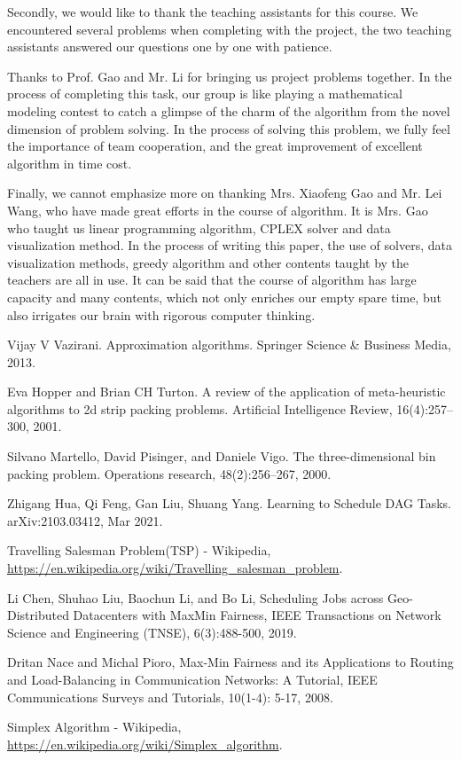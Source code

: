 \documentclass{llncs}
\begin{document}
Secondly, we would like to thank the teaching assistants for this course. We encountered several problems when completing with the project, the two teaching assistants answered our questions one by one with patience.

Thanks to Prof. Gao and Mr. Li for bringing us project problems together. In the process of completing this task, our group is like playing a mathematical modeling contest to catch a glimpse of the charm of the algorithm from the novel dimension of problem solving. In the process of solving this problem, we fully feel the importance of team cooperation, and the great improvement of excellent algorithm in time cost.

Finally, we cannot emphasize more on thanking Mrs. Xiaofeng Gao and Mr. Lei Wang, who have made great efforts in the course of algorithm. It is Mrs. Gao who taught us linear programming algorithm, CPLEX solver and data visualization method. In the process of writing this paper, the use of solvers, data visualization methods, greedy algorithm and other contents taught by the teachers are all in use. It can be said that the course of algorithm has large capacity and many contents, which not only enriches our empty spare time, but also irrigates our brain with rigorous computer thinking.  

%
%
%
% 
% 
%
\begin{thebibliography}{8}

Vijay V Vazirani. Approximation algorithms. Springer Science \& Business Media, 2013.

Eva Hopper and Brian CH Turton. A review of the application of meta-heuristic algorithms to 2d strip packing problems. Artificial Intelligence Review, 16(4):257–300, 2001.

Silvano Martello, David Pisinger, and Daniele Vigo. The three-dimensional bin packing problem. Operations research, 48(2):256–267, 2000.

Zhigang Hua, Qi Feng, Gan Liu, Shuang Yang. Learning to Schedule DAG Tasks. arXiv:2103.03412, Mar 2021.

Travelling Salesman Problem(TSP) - Wikipedia,
\url{https://en.wikipedia.org/wiki/Travelling\_salesman\_problem}.

Li Chen, Shuhao Liu, Baochun Li, and Bo Li, Scheduling Jobs across Geo-Distributed Datacenters with MaxMin Fairness, IEEE Transactions on Network Science and Engineering (TNSE), 6(3):488-500, 2019.

Dritan Nace and Michal Pioro, Max-Min Fairness and its Applications to Routing and Load-Balancing in Communication Networks: A Tutorial, IEEE Communications Surveys and Tutorials, 10(1-4): 5-17, 2008.

Simplex Algorithm - Wikipedia,
\url{https://en.wikipedia.org/wiki/Simplex\_algorithm}.

\end{thebibliography}
\end{document}
